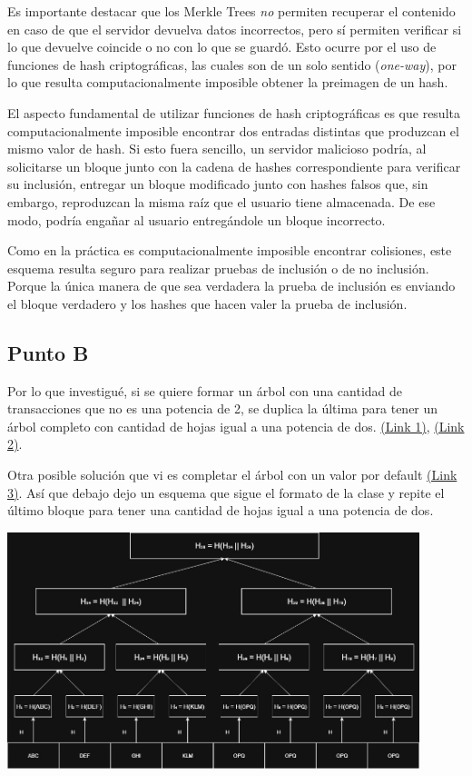 \documentclass[12pt]{article}
\begin{document}
Es importante destacar que los Merkle Trees \emph{no} permiten recuperar el contenido en caso de que el servidor devuelva datos incorrectos, pero sí permiten verificar si lo que devuelve coincide o no con lo que se guardó. Esto ocurre por el uso de funciones de hash criptográficas, las cuales son de un solo sentido (\emph{one-way}), por lo que resulta computacionalmente imposible obtener la preimagen de un hash.

El aspecto fundamental de utilizar funciones de hash criptográficas es que resulta computacionalmente imposible encontrar dos entradas distintas que produzcan el mismo valor de hash. Si esto fuera sencillo, un servidor malicioso podría, al solicitarse un bloque junto con la cadena de hashes correspondiente para verificar su inclusión, entregar un bloque modificado junto con hashes falsos que, sin embargo, reproduzcan la misma raíz que el usuario tiene almacenada. De ese modo, podría engañar al usuario entregándole un bloque incorrecto.

Como en la práctica es computacionalmente imposible encontrar colisiones, este esquema resulta seguro para realizar pruebas de inclusión o de no inclusión. Porque la única manera de que sea verdadera la prueba de inclusión es enviando el bloque verdadero y los hashes que hacen valer la prueba de inclusión.

\subsection*{Punto B}

Por lo que investigué, si se quiere formar un árbol con una cantidad de transacciones que no es una potencia de 2, se duplica la última para tener un árbol completo con cantidad de hojas igual a una potencia de dos. \href{https://bitcoin.stackexchange.com/questions/79364/are-number-of-transactions-in-merkle-tree-always-even}{(Link 1)}, \href{https://www.geeksforgeeks.org/software-engineering/blockchain-merkle-trees/}{(Link 2)}.  

Otra posible solución que vi es completar el árbol con un valor por default \href{https://ethresear.ch/t/merkle-tree-formation-with-odd-number-of-leaves/2681}{(Link 3)}. Así que debajo dejo un esquema que sigue el formato de la clase y repite el último bloque para tener una cantidad de hojas igual a una potencia de dos.

\begin{center}
\includegraphics[width=0.9\textwidth]{mt.jpg}
\end{center}
\end{document}

